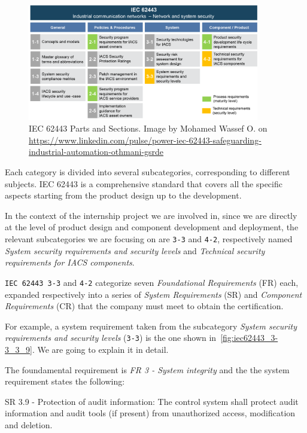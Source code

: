 \begin{figure}[ht]
  \centering
  \includegraphics[width=0.9\textwidth]{chapters/04/assets/iec62443.png}
  \caption[IEC 62443 Parts and Sections. Image by Mohamed Wassef O.]{IEC 62443 Parts and Sections. Image by Mohamed Wassef O. on \url{https://www.linkedin.com/pulse/power-iec-62443-safeguarding-industrial-automation-othmani-gsrde}}
  \label{fig:iec-62443}
\end{figure}

Each category is divided into several subcategories, corresponding to different subjects. IEC 62443 is a comprehensive standard that covers all the specific aspects starting from the product design up to the development.

In the context of the internship project we are involved in, since we are directly at the level of product design and component development and deployment, the relevant subcategories we are focusing on are \texttt{3-3} and \texttt{4-2}, respectively named \textit{System security requirements and security levels} and \textit{Technical security requirements for IACS components}.

\texttt{IEC 62443 3-3} and \texttt{4-2} categorize seven \textit{Foundational Requirements} (FR) each, expanded respectively into a series of \textit{System Requirements} (SR) and \textit{Component Requirements} (CR) that the company must meet to obtain the certification.

For example, a system requirement taken from the subcategory \textit{System security requirements and security levels} (\texttt{3-3}) is the one shown in~\cref{fig:iec62443_3-3_3_9}. We are going to explain it in detail.

The foundamental requirement is \textit{FR 3 - System integrity} and the the system requirement states the following:
\begin{mdframed}
  SR 3.9 - Protection of audit information: The control system shall protect audit information and audit tools (if present) from unauthorized access, modification and deletion.
\end{mdframed}\label{sr:3-3_3-9}

